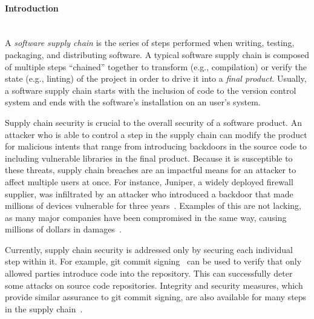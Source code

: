 

\paragraph{Introduction}\mbox{}\\

A {\it software supply chain} is the series of steps performed when writing,
testing, packaging, and distributing software.  A typical software supply chain
is composed of multiple steps ``chained'' together to transform (e.g.,
compilation) or verify the state (e.g., linting) of the project in order to
drive it into a {\it final product}. Usually, a software supply chain starts
with the inclusion of code to the version control system and ends with the
software's installation on an user's system.

Supply chain security is crucial to the overall security of a software product.
An attacker who is able to control a step in the supply chain can modify the
product for malicious intents that range from introducing backdoors in the
source code to including vulnerable libraries in the final product. Because it
is susceptible to these threats, supply chain breaches are an impactful means
for an attacker to affect multiple users at once. For instance, Juniper, a
widely deployed firewall supplier, was infiltrated by an attacker who
introduced a backdoor that made millions of devices vulnerable for three
years~\cite{juniper-backdoor}. Examples of this are not lacking, as many major
companies have been compromised in the same way, causing millions of dollars in
damages~\cite{aurora-scm, adobe-hack, github-hacked-millions}.

Currently, supply chain security is addressed only by securing each individual
step within it. For example, git commit signing~\cite{git-sign} can be used to
verify that only allowed parties introduce code into the repository. This can
successfully deter some attacks on source code repositories. Integrity and
security measures, which provide similar assurance to git commit signing, are
also available for many steps in the supply chain~\cite{reprobuilds, codeship,
twistlock, clair-coreos, signed-push}.

